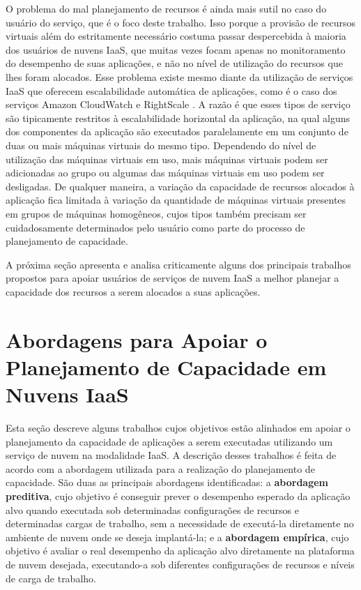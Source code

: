 O problema do mal planejamento de recursos é ainda mais sutil no caso do usuário do serviço, que é o foco deste trabalho. Isso porque a provisão de recursos virtuais além do estritamente necessário costuma passar despercebida à maioria dos usuários de nuvens IaaS, que muitas vezes focam apenas no monitoramento do desempenho de suas aplicações, e não no nível de utilização do recursos que lhes foram alocados. Esse problema existe mesmo diante da utilização de serviços IaaS que oferecem escalabilidade automática de aplicações, como é o caso dos serviços Amazon CloudWatch \cite{amazon_watch} e RightScale \cite{rightscale}. A razão é que esses tipos de serviço são tipicamente restritos à escalabilidade horizontal da aplicação, na qual alguns dos componentes da aplicação são executados paralelamente em um conjunto de duas ou mais máquinas virtuais do mesmo tipo. Dependendo do nível de utilização das máquinas virtuais em uso, mais máquinas virtuais podem ser adicionadas ao grupo ou algumas das máquinas virtuais em uso podem ser desligadas. De qualquer maneira, a variação da capacidade de recursos alocados à aplicação fica limitada à variação da quantidade de máquinas virtuais presentes em grupos de máquinas homogêneos, cujos tipos também precisam ser cuidadosamente determinados pelo usuário como parte do processo de planejamento de capacidade. 

A próxima seção apresenta e analisa criticamente alguns dos principais trabalhos propostos para apoiar usuários de serviços de nuvem IaaS a melhor planejar a capacidade dos recursos a serem alocados a suas aplicações.

\section{Abordagens para Apoiar o Planejamento de Capacidade em Nuvens IaaS}

Esta seção descreve alguns trabalhos cujos objetivos estão alinhados em apoiar o planejamento da capacidade de aplicações a serem executadas utilizando um serviço de nuvem na modalidade IaaS. A descrição desses trabalhos é feita de acordo com a abordagem utilizada para a realização do planejamento de capacidade. São duas as principais abordagens identificadas: a \textbf{abordagem preditiva}, cujo objetivo é conseguir prever o desempenho esperado da aplicação alvo quando executada sob determinadas configurações de recursos e determinadas cargas de trabalho, sem a necessidade de executá-la diretamente no ambiente de nuvem onde se deseja implantá-la; e a \textbf{abordagem empírica}, cujo objetivo é avaliar o real desempenho da aplicação alvo diretamente na plataforma de nuvem desejada, executando-a sob diferentes configurações de recursos e níveis de carga de trabalho. 


